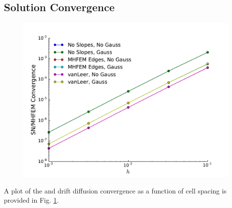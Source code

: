 \subsection{Solution Convergence}
\begin{figure} \centering
	\includegraphics[width=6in]{figs/hlimit.pdf}
	\caption{}
	\label{fig:hlimit}
\end{figure}
A plot of the \SN and drift diffusion convergence as a function of cell spacing is provided in Fig. \ref{fig:hlimit}. 

